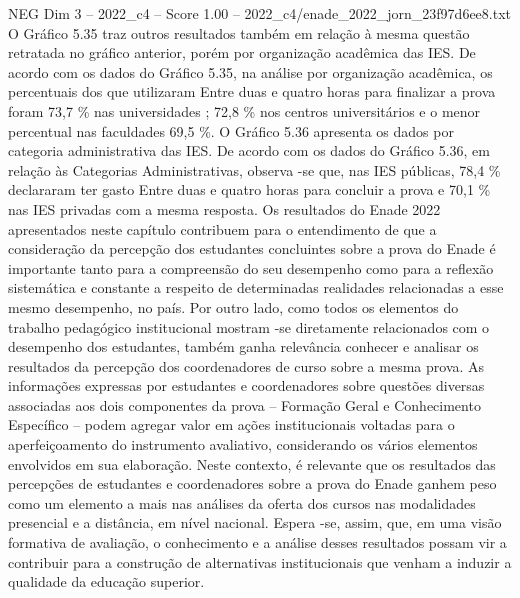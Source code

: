 \begin{textsample}{NEG Dim 3 – 2022\_c4 – Score 1.00 – 2022\_c4/enade\_2022\_jorn\_23f97d6ee8.txt}
O Gráfico 5.35 traz outros resultados também em relação à mesma questão retratada no gráfico anterior, porém por organização acadêmica das IES.
De acordo com os dados do Gráfico 5.35, na análise por organização acadêmica, os percentuais dos que utilizaram Entre duas e quatro horas para finalizar a prova foram 73,7 \% nas universidades ; 72,8 \% nos centros universitários e o menor percentual nas faculdades 69,5 \%.
O Gráfico 5.36 apresenta os dados por categoria administrativa das IES.
De acordo com os dados do Gráfico 5.36, em relação às Categorias Administrativas, observa -se que, nas IES públicas, 78,4 \% declararam ter gasto Entre duas e quatro horas para concluir a prova e 70,1 \% nas IES privadas com a mesma resposta.
Os resultados do Enade 2022 apresentados neste capítulo contribuem para o entendimento de que a consideração da percepção dos estudantes concluintes sobre a prova do Enade é importante tanto para a compreensão do seu desempenho como para a reflexão sistemática e constante a respeito de determinadas realidades relacionadas a esse mesmo desempenho, no país.
Por outro lado, como todos os elementos do trabalho pedagógico institucional mostram -se diretamente relacionados com o desempenho dos estudantes, também ganha relevância conhecer e analisar os resultados da percepção dos coordenadores de curso sobre a mesma prova.
As informações expressas por estudantes e coordenadores sobre questões diversas associadas aos dois componentes da prova – Formação Geral e Conhecimento Específico – podem agregar valor em ações institucionais voltadas para o aperfeiçoamento do instrumento avaliativo, considerando os vários elementos envolvidos em sua elaboração.
Neste contexto, é relevante que os resultados das percepções de estudantes e coordenadores sobre a prova do Enade ganhem peso como um elemento a mais nas análises da oferta dos cursos nas modalidades presencial e a distância, em nível nacional.
Espera -se, assim, que, em uma visão formativa de avaliação, o conhecimento e a análise desses resultados possam vir a contribuir para a construção de alternativas institucionais que venham a induzir a qualidade da educação superior.

\end{textsample}
